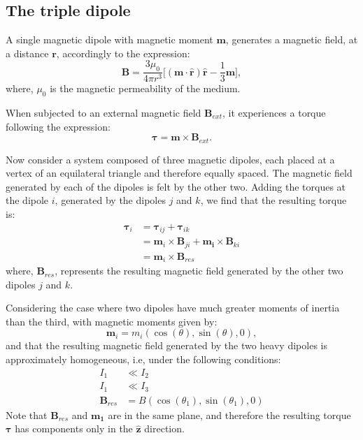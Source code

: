 
\subsection{The triple dipole}
A single magnetic dipole with magnetic moment $\boldsymbol{m}$, generates a magnetic field, at a distance $\boldsymbol{r}$, accordingly to the expression: 
\begin{equation}
    \boldsymbol{B} = \dfrac{3\mu_0}{4 \pi r^3}\bigg[ (\boldsymbol{m \cdot \hat{r}})\boldsymbol{\hat{r}} - \dfrac{1}{3}\boldsymbol{m} \bigg],
    \label{eq:MagneticFieldDipole}
\end{equation}
where, $\mu_0$ is the magnetic permeability of the medium. 

When subjected to an external magnetic field $\boldsymbol{B}_{ext}$, it experiences a torque following the expression: 
\begin{equation}
    \boldsymbol{\tau} = \boldsymbol{m} \times \boldsymbol{B}_{ext}.
    \label{eq:NewtonSecondLaw}
\end{equation}

Now consider a system composed of three magnetic dipoles, each placed at a vertex of an equilateral triangle and therefore equally spaced. The magnetic field generated by each of the dipoles is felt by the other two. Adding the torques at the dipole $i$, generated by the dipoles $j$ and $k$, we find that the resulting torque is:
\begin{equation}
    \begin{aligned}
        \boldsymbol{\tau}_i &= \boldsymbol{\tau}_{ij} + \boldsymbol{\tau}_{ik}\\
            & =  \boldsymbol{m}_i \times \boldsymbol{B}_{j i}+\boldsymbol{m_i} \times \boldsymbol{B}_{k i}\\
            &= \boldsymbol{m}_i \times \boldsymbol{B}_{res}
    \end{aligned}
    \label{eq:Torques}
\end{equation}
where, $\boldsymbol{B}_{res}$, represents the resulting magnetic field generated by the other two dipoles $j$ and $k$. 

Considering the case where two dipoles have much greater moments of inertia than the third, with magnetic moments given by:
\begin{equation}
    \boldsymbol{m}_i = m_i (\cos(\theta), \sin(\theta), 0),
\end{equation}
and that the resulting magnetic field generated by the two heavy dipoles is approximately homogeneous, i.e, under the following conditions:
\begin{equation}
    \begin{aligned}
        I_1 & \ll I_2\\
        I_1 & \ll I_3\\
        \boldsymbol{B}_{res} &= B(\cos(\theta_1),\sin(\theta_1), 0)
    \end{aligned}
    \label{eq:Hipotesys}
\end{equation}
Note that $\boldsymbol{B}_{res}$ and $\boldsymbol{m_1}$ are in the same plane, and therefore the resulting torque $\boldsymbol{\tau}$ has components only in the $\boldsymbol{\hat{z}}$ direction. 

